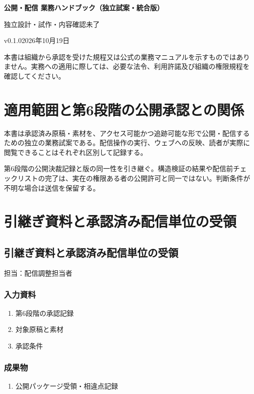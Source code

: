 \documentclass[a4paper,11pt]{article}
\begin{document}
\begin{center}
{\Large\bfseries 公開・配信 業務ハンドブック（独立試案・統合版）}\par\medskip
{\small 独立設計・試作・内容確認未了}\par
{\small v0.1.0\quad 2026年10月19日}\par
\end{center}
\vspace{6mm}
\noindent 本書は組織から承認を受けた規程又は公式の業務マニュアルを示すものではありません。実務への適用に際しては、必要な法令、利用許諾及び組織の権限規程を確認してください。\par
\tableofcontents
\clearpage
\section{適用範囲と第6段階の公開承認との関係}
\par 本書は承認済み原稿・素材を、アクセス可能かつ追跡可能な形で公開・配信するための独立の業務試案である。配信操作の実行、ウェブへの反映、読者が実際に閲覧できることはそれぞれ区別して記録する。\par\medskip
\par 第6段階の公開決裁記録と版の同一性を引き継ぐ。構造検証の結果や配信前チェックリストの完了は、実在の権限ある者の公開許可と同一ではない。判断条件が不明な場合は送信を保留する。\par\medskip
\section{引継ぎ資料と承認済み配信単位の受領}
\subsection{引継ぎ資料と承認済み配信単位の受領}
\par 担当：配信調整担当者\par\medskip
\subsubsection*{入力資料}
\begin{enumerate}[leftmargin=2em,itemsep=0.35em]
\item 第6段階の承認記録
\item 対象原稿と素材
\item 承認条件
\end{enumerate}
\subsubsection*{成果物}
\begin{enumerate}[leftmargin=2em,itemsep=0.35em]
\item 公開パッケージ受領・相違点記録
\end{enumerate}
\end{document}
